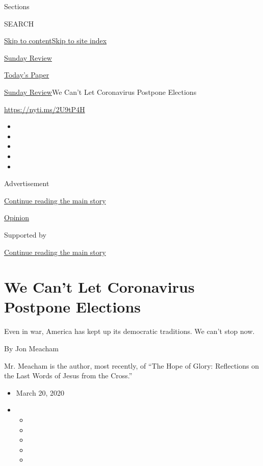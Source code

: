 Sections

SEARCH

\protect\hyperlink{site-content}{Skip to
content}\protect\hyperlink{site-index}{Skip to site index}

\href{https://www.nytimes3xbfgragh.onion/section/opinion/sunday}{Sunday
Review}

\href{https://myaccount.nytimes3xbfgragh.onion/auth/login?response_type=cookie\&client_id=vi}{}

\href{https://www.nytimes3xbfgragh.onion/section/todayspaper}{Today's
Paper}

\href{/section/opinion/sunday}{Sunday Review}\textbar{}We Can't Let
Coronavirus Postpone Elections

\url{https://nyti.ms/2U9tP4H}

\begin{itemize}
\item
\item
\item
\item
\item
\end{itemize}

Advertisement

\protect\hyperlink{after-top}{Continue reading the main story}

\href{/section/opinion}{Opinion}

Supported by

\protect\hyperlink{after-sponsor}{Continue reading the main story}

\hypertarget{we-cant-let-coronavirus-postpone-elections}{%
\section{We Can't Let Coronavirus Postpone
Elections}\label{we-cant-let-coronavirus-postpone-elections}}

Even in war, America has kept up its democratic traditions. We can't
stop now.

By Jon Meacham

Mr. Meacham is the author, most recently, of ``The Hope of Glory:
Reflections on the Last Words of Jesus from the Cross.''

\begin{itemize}
\item
  March 20, 2020
\item
  \begin{itemize}
  \item
  \item
  \item
  \item
  \item
  \end{itemize}
\end{itemize}

